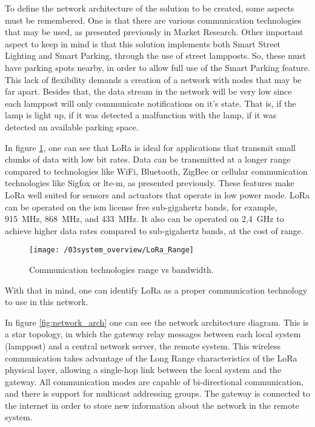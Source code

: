 To define the network architecture of the solution to be created, some aspects must be remembered. One is that there are various communication technologies that may be used, as presented previously in Market Research. Other important aspect to keep in mind is that this solution implements both Smart Street Lighting and Smart Parking, through the use of street lampposts. So, these must have parking spots nearby, in order to allow full use of the Smart Parking feature. This lack of flexibility demands a creation of a network with nodes that may be far apart. Besides that, the data stream in the network will be very low since each lamppost will only communicate notifications on it's state. That is, if the lamp is light up, if it was detected a malfunction with the lamp, if it was detected an available parking space. 

In figure \ref{fig:LoRa_Range}, one can see that LoRa is ideal for applications that transmit small chunks of data with low bit rates. Data can be transmitted at a longer range compared to technologies like WiFi, Bluetooth, ZigBee or cellular communication technologies like Sigfox or \ac{lte-m}, as presented previously. These features make LoRa well suited for sensors and actuators that operate in low power mode. LoRa can be operated on the \ac{ism} license free sub-gigahertz bands, for example, 915~MHz, 868~MHz, and 433~MHz. It also can be operated on 2,4~GHz to achieve higher data rates compared to sub-gigahertz bands, at the cost of range. \cite{lora_lorawan}

\clearpage
\begin{figure}[ht]
	\centering
	\texttt{[image: /03system\_overview/LoRa\_Range]}
	\caption{Communication technologies range vs bandwidth.}
	\label{fig:LoRa_Range}
\end{figure}

With that in mind, one can identify LoRa as a proper communication technology to use in this network. 

In figure \ref{fig:network_arch} one can see the network architecture diagram. This is a star topology, in which the gateway relay messages between each local system (lamppost) and a central network server, the remote system. This wireless communication takes advantage of the Long Range characteristics of the LoRa physical layer, allowing a single-hop link between the local system and the gateway. All communication modes are capable of bi-directional communication, and there is support for multicast addressing groups. The gateway is connected to the internet in order to store new information about the network in the remote system.

